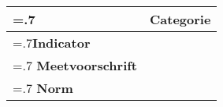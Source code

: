 \noindent
\begin{longtable}{|>{\raggedleft\hsize=.7\hsize\bfseries}X|
    >{\arraybackslash\hsize=1.3\hsize}X|} \hline
\multicolumn{1}{|l|}{\textbf{NFR}} & Categorie\\ \hline
Indicator & \\ \hline
Meetvoorschrift & \\ \hline
Norm & \\ \hline
\end{longtable}